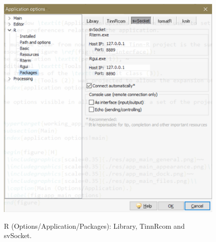 \begin{figure}[h!]
  \includegraphics[scale=0.45]{./res/app_r_packages_svsocket.png}\\
  \caption{R (Options/Application/Packages): Library, TinnRcom and svSocket.}
  \label{fig:app_r_b}
\end{figure}

